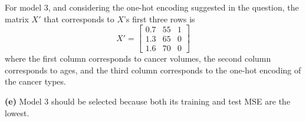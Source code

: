 \documentclass[leqno]{article}
\begin{document}
For model 3, and considering the one-hot encoding suggested in the question, the matrix $X'$ that corresponds to $X$'s first three rows is
\[
X'=
  \begin{bmatrix}
    0.7 & 55 & 1\\
    1.3 & 65 & 0 \\
    1.6 & 70 & 0
  \end{bmatrix}
\]
where the first column corresponds to cancer volumes, the second column corresponds to ages, and the third column corresponds to the one-hot encoding 
of the cancer types.

\textbf{(e)} Model 3 should be selected because both its training and test MSE are the lowest.
\end{document}
